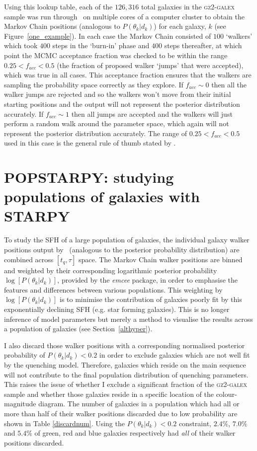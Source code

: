 Using this lookup table, each of the $126,316$ total galaxies in the \textsc{gz2-galex} sample was run through \starpy ~on multiple cores of a computer cluster to obtain the Markov Chain positions (analogous to $P(\theta_k|d_k)$) for each galaxy, $k$ (see Figure~\ref{one_example}). In each case the Markov Chain consisted of $100$ `walkers' which took $400$ steps in the `burn-in' phase and $400$ steps thereafter, at which point the MCMC acceptance fraction was checked to be within the range $0.25 < f_{acc} < 0.5$ (the fraction of proposed walker `jumps' that were accepted), which was true in all cases. This acceptance fraction ensures that the walkers are sampling the probability space correctly as they explore. If $f_{acc} \sim 0$ then all the walker jumps are rejected and so the walkers won't move from their initial starting positions and the output will not represent the posterior distribution accurately. If $f_{acc} \sim 1$ then all jumps are accepted and the walkers will just perform a random walk around the parameter space, which again will not represent the posterior distribution accurately. The range of $0.25 < f_{acc} < 0.5$ used in this case is the general rule of thumb stated by \citet*{gelman96}.


\section{POPSTARPY: studying populations of galaxies with STARPY}\label{popstarpy}

To study the SFH of a large population of galaxies, the individual galaxy walker positions output by \starpy ~(analogous to the posterior probability distribution) are combined across $[t_q, \tau]$ space. The Markov Chain walker positions are binned and weighted by their corresponding logarithmic posterior probability $\log [P(\theta_k|d_k)]$, provided by the \emph{emcee} package, in order to emphasise the features and differences between various populations. This weighting by $\log [P(\theta_k|d_k)]$ is to minimise the contribution of galaxies poorly fit by this exponentially declining SFH (e.g. star forming galaxies). This is no longer inference of model parameters but merely a method to visualise the results across a population of galaxies (see Section~\ref{althyper}).

I also discard those walker positions with a corresponding normalised posterior probability of $P(\theta_k|d_k) < 0.2$ in order to exclude galaxies which are not well fit by the quenching model. Therefore, galaxies which reside on the main sequence will not contribute to the final population distribution of quenching parameters. This raises the issue of whether I exclude a significant fraction of the \textsc{gz2-galex} sample and whether those galaxies reside in a specific location of the colour-magnitude diagram. The number of galaxies in a population which had all or more than half of their walker positions discarded due to low probability are shown in Table \ref{discardnum}. Using the $P(\theta_k|d_k) < 0.2$ constraint, $2.4\%$, $7.0\%$ and $5.4\%$ of green, red and blue galaxies respectively had \emph{all} of their walker positions discarded. 

